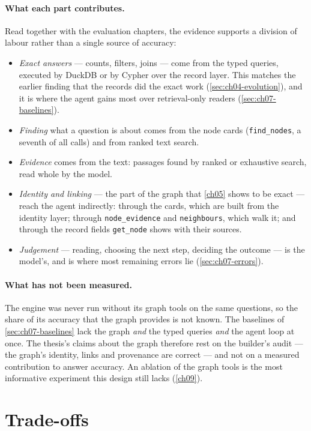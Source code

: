 \paragraph{What each part contributes.} Read together with the evaluation chapters, the evidence supports a
division of labour rather than a single source of accuracy:
\begin{itemize}[nosep]
\item \emph{Exact answers} --- counts, filters, joins --- come from the typed queries, executed by DuckDB or by
Cypher over the record layer. This matches the earlier finding that the records did the exact work
(\cref{sec:ch04-evolution}), and it is where the agent gains most over retrieval-only readers
(\cref{sec:ch07-baselines}).
\item \emph{Finding} what a question is about comes from the node cards (\texttt{find\_nodes}, a seventh of all
calls) and from ranked text search.
\item \emph{Evidence} comes from the text: passages found by ranked or exhaustive search, read whole by the model.
\item \emph{Identity and linking} --- the part of the graph that \cref{ch05} shows to be exact --- reach the agent
indirectly: through the cards, which are built from the identity layer; through \texttt{node\_evidence} and
\texttt{neighbours}, which walk it; and through the record fields \texttt{get\_node} shows with their sources.
\item \emph{Judgement} --- reading, choosing the next step, deciding the outcome --- is the model's, and is where most
remaining errors lie (\cref{sec:ch07-errors}).
\end{itemize}

\paragraph{What has not been measured.} The engine was never run without its graph tools on the same questions, so
the share of its accuracy that the graph provides is not known. The baselines of \cref{sec:ch07-baselines} lack the
graph \emph{and} the typed queries \emph{and} the agent loop at once. The thesis's claims about the graph therefore
rest on the builder's audit --- the graph's identity, links and provenance are correct --- and not on a measured
contribution to answer accuracy. An ablation of the graph tools is the most informative experiment this design still
lacks (\cref{ch09}).

\section{Trade-offs}\label{sec:ch08-trade-offs}


